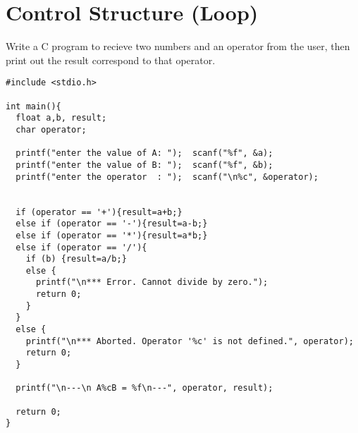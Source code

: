 \section{Control Structure (Loop)}

\begin{example}
  Write a C program to recieve two numbers and an operator
  from the user, then print out the result correspond to
  that operator.
\end{example}
\begin{lstlisting}[language=cmeng]
#include <stdio.h>

int main(){
  float a,b, result;
  char operator;

  printf("enter the value of A: ");  scanf("%f", &a);
  printf("enter the value of B: ");  scanf("%f", &b);
  printf("enter the operator  : ");  scanf("\n%c", &operator);


  if (operator == '+'){result=a+b;}
  else if (operator == '-'){result=a-b;}
  else if (operator == '*'){result=a*b;}
  else if (operator == '/'){
    if (b) {result=a/b;}
    else {
      printf("\n*** Error. Cannot divide by zero.");
      return 0;
    }
  }
  else {
    printf("\n*** Aborted. Operator '%c' is not defined.", operator);
    return 0;
  }

  printf("\n---\n A%cB = %f\n---", operator, result);

  return 0;
}
\end{lstlisting}





